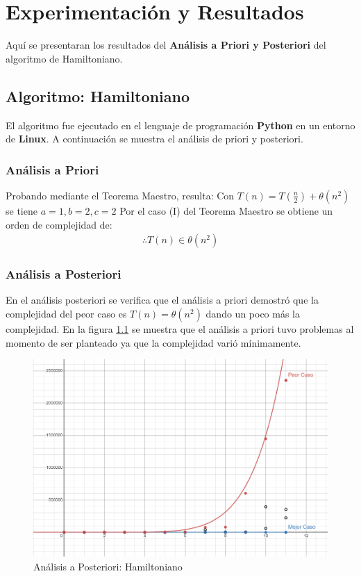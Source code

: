 \chapter{Experimentación y Resultados}
    Aquí se presentaran los resultados del \textbf{Análisis a Priori y Posteriori} del algoritmo de Hamiltoniano.
    
\section{Algoritmo: Hamiltoniano}
El algoritmo fue ejecutado en el lenguaje de programación \textbf{Python} en un entorno de \textbf{Linux}. A continuación se muestra el análisis de priori y posteriori. 
    \subsection{Análisis a Priori}
        Probando mediante el Teorema Maestro, resulta:
            Con \(T(n) = T(\frac{n}{2}) + \theta(n^{2})\) se tiene \(a=1, b=2, c=2\)
            \newline
            Por el caso (I) del Teorema Maestro se obtiene un orden de complejidad de: 
                \begin{gather*}
                    \therefore T(n)\in \theta(n^{2})
                \end{gather*}
    
    \newpage    
    \subsection{Análisis a Posteriori}
        En el análisis posteriori se verifica que el análisis a priori demostró que la complejidad del peor caso es \(T(n) = \theta(n^{2})\) dando un poco más la complejidad. En la figura \ref{fig:posteriori1} se muestra que el análisis a priori tuvo problemas al momento de ser planteado ya que la complejidad varió mínimamente. 
        \begin{figure}[htp!]
            \centering
            \includegraphics[width=1 \textwidth]{Images/A_Posteriori/posteriori.png}  
            \caption{Análisis a Posteriori: Hamiltoniano}
            \label{fig:posteriori1}
        \end{figure}
    
